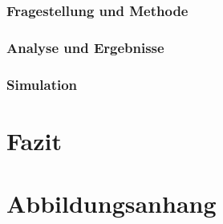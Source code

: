 \documentclass[openany,twoside,twocolumn]{book}
\let\pby\printbibliography
\renewcommand{\printbibliography}{}
\begin{document}
\hypertarget{fragestellung-und-methode-1}{%
\subsection{Fragestellung und
Methode}\label{fragestellung-und-methode-1}}

\hypertarget{analyse-und-ergebnisse-1}{%
\subsection{Analyse und Ergebnisse}\label{analyse-und-ergebnisse-1}}

\hypertarget{simulation-2}{%
\subsection{Simulation}\label{simulation-2}}

\newpage
\pby[title={Literatur},segment=\therefsegment,heading=subbibintoc]

\hypertarget{fazit}{%
\chapter{Fazit}\label{fazit}}

\hypertarget{abbildungsanhang}{%
\chapter{Abbildungsanhang}\label{abbildungsanhang}}

\begingroup
\let\clearpage\relax
\listoffigures
\endgroup

\printbibliography
\end{document}
